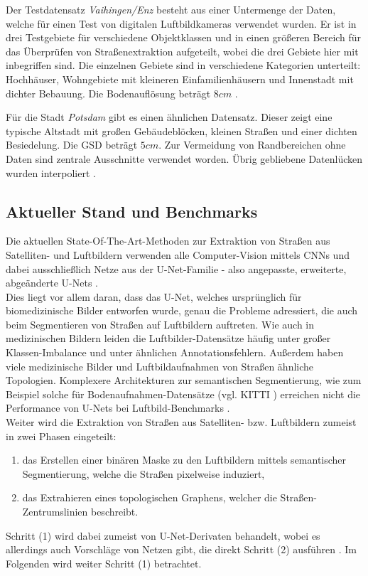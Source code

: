 Der Testdatensatz \textit{Vaihingen/Enz} besteht aus einer Untermenge der Daten, welche für einen Test von digitalen Luftbildkameras verwendet wurden.
Er ist in drei Testgebiete für verschiedene Objektklassen und in einen größeren Bereich für das Überprüfen von Straßenextraktion aufgeteilt, wobei die drei Gebiete hier mit inbegriffen sind.
Die einzelnen Gebiete sind in verschiedene Kategorien unterteilt: Hochhäuser, Wohngebiete mit kleineren Einfamilienhäusern und Innenstadt mit dichter Bebauung.
Die Bodenauflösung beträgt $8cm$ \cite{Englich.06.10.2022b}.

Für die Stadt \textit{Potsdam} gibt es einen ähnlichen Datensatz. 
Dieser zeigt eine typische Altstadt mit großen Gebäudeblöcken, kleinen Straßen und einer dichten Besiedelung.
Die \ac{GSD} beträgt $5cm$.
Zur Vermeidung von Randbereichen ohne Daten sind zentrale Ausschnitte verwendet worden.
Übrig gebliebene Datenlücken wurden interpoliert \cite{Englich.17.11.2022}.

\subsection{Aktueller Stand und Benchmarks} \label{sec:state-of-the-art-roads} %

Die aktuellen State-Of-The-Art-Methoden zur Extraktion von Straßen aus Satelliten- und Luftbildern verwenden 
alle Computer-Vision mittels \acp{CNN} und dabei ausschließlich Netze aus der U-Net-Familie - also angepasste, 
erweiterte, abgeänderte U-Nets \cites{C.Henry.2021, Constantin.2018, Kamiya.2018, Yerram.2022}. \\
Dies liegt vor allem daran, dass das U-Net, welches ursprünglich für biomedizinische Bilder entworfen wurde, 
genau die Probleme adressiert, die auch beim Segmentieren von Straßen auf Luftbildern auftreten. 
Wie auch in medizinischen Bildern leiden die Luftbilder-Datensätze häufig unter großer Klassen-Imbalance 
und unter ähnlichen Annotationsfehlern. Außerdem haben viele medizinische Bilder und Luftbildaufnahmen von Straßen 
ähnliche Topologien. Komplexere Architekturen zur semantischen Segmentierung, wie zum Beispiel solche 
für Bodenaufnahmen-Datensätze (vgl. KITTI \cite{Geiger.2013}) erreichen nicht die Performance von U-Nets bei 
Luftbild-Benchmarks \cite{C.Henry.2021}. \\
Weiter wird die Extraktion von Straßen aus Satelliten- bzw. Luftbildern zumeist in zwei Phasen eingeteilt: 
\begin{enumerate}
	\item das Erstellen einer binären Maske zu den Luftbildern mittels semantischer Segmentierung, 
	welche die Straßen pixelweise induziert, 
	\item das Extrahieren eines topologischen Graphens, welcher die Straßen-Zentrumslinien beschreibt.   
\end{enumerate}
Schritt (1) wird dabei zumeist von U-Net-Derivaten behandelt, wobei es allerdings auch Vorschläge von Netzen gibt, 
die direkt Schritt (2) ausführen \cite{C.Henry.2021}.
Im Folgenden wird weiter Schritt (1) betrachtet.   

